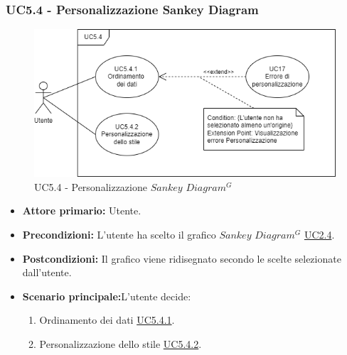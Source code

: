 \newpage
\subsubsection{UC5.4 - Personalizzazione Sankey Diagram}
\label{sec:UC5.4}
\begin{figure}[h!]
	\centering
	\includegraphics[scale=0.60]{../../assets/personalizzazioneSankey.png}
	\caption{UC5.4 - Personalizzazione $Sankey$ $Diagram^{G}$}
\end{figure}
\begin{itemize}
    \item \textbf{Attore primario:} Utente.
	\item \textbf{Precondizioni:} L'utente ha scelto il grafico $Sankey$ $Diagram^{G}$ \hyperref[sec:UC2.4]{UC2.4}.
	\item \textbf{Postcondizioni:} Il grafico viene ridisegnato secondo le scelte selezionate dall'utente.
	\item \textbf{Scenario principale:}L'utente decide:
	\begin{enumerate}
        \item Ordinamento dei dati \hyperref[sec:UC5.4.1]{UC5.4.1}.
        \item Personalizzazione dello stile \hyperref[sec:UC5.4.2]{UC5.4.2}.
    \end{enumerate}
\end{itemize}

